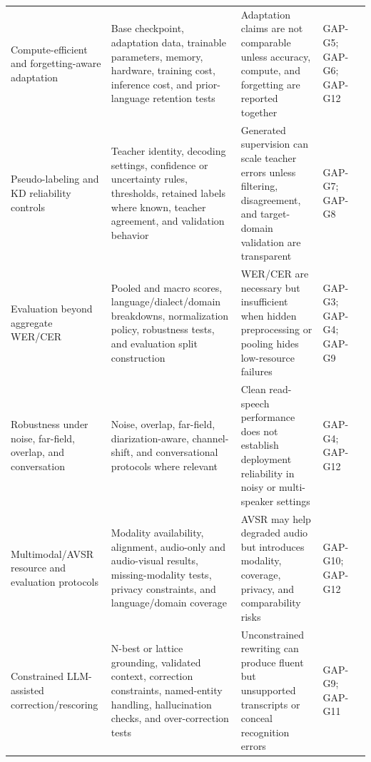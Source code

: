 \documentclass[pdflatex,sn-basic,iicol]{sn-jnl}
\theoremstyle{thmstyleone}
\theoremstyle{thmstyletwo}
\theoremstyle{thmstylethree}
\begin{document}
\begin{table}[htbp]
\begin{tabularx}{\textwidth}{YYYYY}
Compute-efficient and forgetting-aware adaptation & Base checkpoint, adaptation data, trainable parameters, memory, hardware, training cost, inference cost, and prior-language retention tests & Adaptation claims are not comparable unless accuracy, compute, and forgetting are reported together & GAP-G5; GAP-G6; GAP-G12 & \citep{getman24_interspeech,udupa24_interspeech,qian24_interspeech,feng2022superbslt} \\
Pseudo-labeling and KD reliability controls & Teacher identity, decoding settings, confidence or uncertainty rules, thresholds, retained labels where known, teacher agreement, and validation behavior & Generated supervision can scale teacher errors unless filtering, disagreement, and target-domain validation are transparent & GAP-G7; GAP-G8 & \citep{park20d_interspeech,khurana2020dust,leal21_interspeech,bhogale24_interspeech} \\
Evaluation beyond aggregate WER/CER & Pooled and macro scores, language/dialect/domain breakdowns, normalization policy, robustness tests, and evaluation split construction & WER/CER are necessary but insufficient when hidden preprocessing or pooling hides low-resource failures & GAP-G3; GAP-G4; GAP-G9 & \citep{shi2023mlsuperb,conneau2022fleurs,conneau2022xtreme_s,karita2023lenient} \\
Robustness under noise, far-field, overlap, and conversation & Noise, overlap, far-field, diarization-aware, channel-shift, and conversational protocols where relevant & Clean read-speech performance does not establish deployment reliability in noisy or multi-speaker settings & GAP-G4; GAP-G12 & \citep{watanabe2020chime6,cornell2023chime7} \\
Multimodal/AVSR resource and evaluation protocols & Modality availability, alignment, audio-only and audio-visual results, missing-modality tests, privacy constraints, and language/domain coverage & AVSR may help degraded audio but introduces modality, coverage, privacy, and comparability risks & GAP-G10; GAP-G12 & \citep{shi2022avhubert,shi2022robustavsr,anwar23_interspeech} \\
Constrained LLM-assisted correction/rescoring & N-best or lattice grounding, validated context, correction constraints, named-entity handling, hallucination checks, and over-correction tests & Unconstrained rewriting can produce fluent but unsupported transcripts or conceal recognition errors & GAP-G9; GAP-G11 & \citep{koenecke2024carelesswhisper,ma2024asrerrorcorrection,koudounas2025shallow,wang2025contextasrbench} \\

\end{tabularx}
\end{table}
\end{document}
